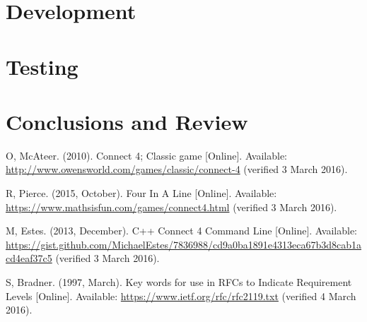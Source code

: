 \documentclass[11pt,onecolumn]{article}
\begin{document}
\section{Development}

\section{Testing}

\section{Conclusions and Review}

\begin{thebibliography}{99}

 O, McAteer. (2010). Connect 4; Classic game [Online]. Available: \url{http://www.owensworld.com/games/classic/connect-4} (verified 3 March 2016).

 R, Pierce. (2015, October). Four In A Line [Online]. Available: \url{https://www.mathsisfun.com/games/connect4.html} (verified 3 March 2016).

 M, Estes. (2013, December). C++ Connect 4 Command Line [Online]. Available: \url{https://gist.github.com/MichaelEstes/7836988/cd9a0ba1891e4313eca67b3d8cab1acd4eaf37c5} (verified 3 March 2016).

 S, Bradner. (1997, March). Key words for use in RFCs to Indicate Requirement Levels [Online]. Available: \url{https://www.ietf.org/rfc/rfc2119.txt} (verified 4 March 2016).

\end{thebibliography}
\end{document}
